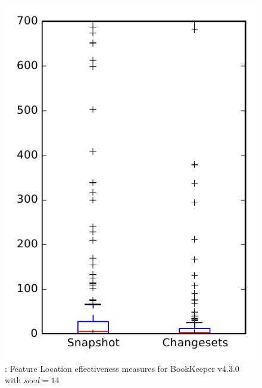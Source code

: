 
\begin{figure}
\centering
\includegraphics[height=0.4\textheight]{figures/flt_seed/rq1_bookkeeper_14}
\caption{\rone: Feature Location effectiveness measures for BookKeeper v4.3.0 with $seed=14$}
\label{fig:flt_seed:rq1:bookkeeper}
\end{figure}
